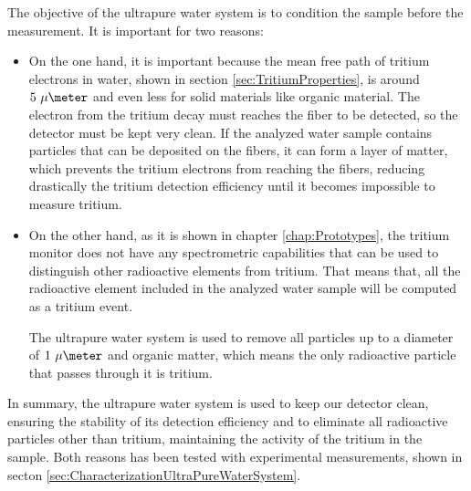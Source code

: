 The objective of the ultrapure water system is to condition the sample before the measurement. It is important for two reasons:

\begin{itemize}

\item{} On the one hand, it is important because the mean free path of tritium electrons in water, shown in section \ref{sec:TritiumProperties},  is around $5~\mu\meter$ and even less for solid materials like organic material. The electron from the tritium decay must reaches the fiber to be detected, so the detector must be kept very clean. If the analyzed water sample contains particles that can be deposited on the fibers, it can form a layer of matter, which prevents the tritium electrons from reaching the fibers, reducing drastically the tritium detection efficiency until it becomes impossible to measure tritium.

\item{} On the other hand, as it is shown in chapter \ref{chap:Prototypes}, the tritium monitor does not have any spectrometric capabilities that can be used to distinguish other radioactive elements from tritium. That means that, all the radioactive element included in the analyzed water sample will be computed as a tritium event.

The ultrapure water system is used to remove all particles up to a diameter of $1~\mu\meter$ and organic matter, which means the only radioactive particle that passes through it is tritium. 


\end{itemize} 

In summary, the ultrapure water system is used to keep our detector clean, ensuring the stability of its detection efficiency and to eliminate all radioactive particles other than tritium, maintaining the activity of the tritium in the sample. Both reasons has been tested with experimental measurements, shown in secton \ref{sec:CharacterizationUltraPureWaterSystem}.